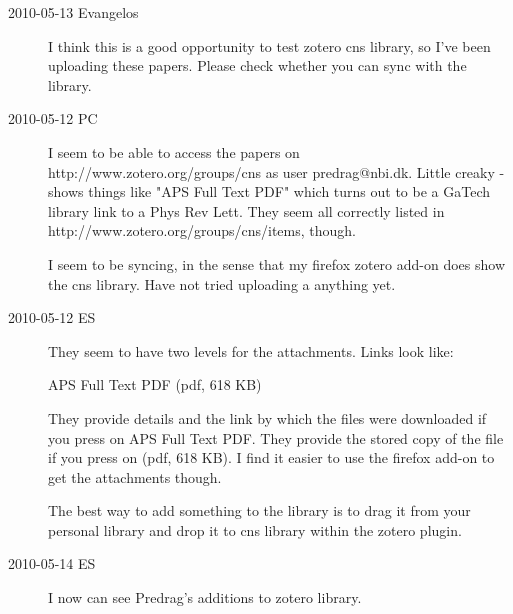 \begin{description}
\item[2010-05-13 Evangelos]
I think this is a good opportunity to test zotero cns library, so I've been uploading these
papers. Please check whether you can sync with the library.

\item[2010-05-12 PC] I seem to be able to access the papers on
{http://www.zotero.org/groups/cns} as user predrag@nbi.dk. Little creaky
- shows things like "APS Full Text PDF" which turns out to be a GaTech
library link to a Phys Rev Lett. They seem all correctly listed in
{http://www.zotero.org/groups/cns/items}, though.

I seem to be syncing, in the sense that my firefox zotero add-on
does show the cns library. Have not tried uploading a
anything yet.

\item[2010-05-12 ES] They seem to have two levels for the attachments. 
Links look like:

APS Full Text PDF  (pdf, 618 KB) 

They provide details and the link by which the files were downloaded if you press
on APS Full Text PDF. They provide the stored copy of the file if you press
on (pdf, 618 KB). I find it easier to use the firefox add-on to get the attachments though.

The best  way to add something to the library
is to drag it from your personal library and drop it to cns library within the zotero plugin.

\item[2010-05-14 ES]

I now can see Predrag's additions to zotero library.




\end{description}
